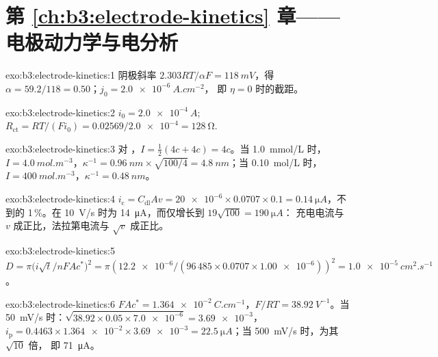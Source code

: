 \section*{第 \ref{ch:b3:electrode-kinetics} 章——电极动力学与电分析}

\begin{solution}{exo:b3:electrode-kinetics:1}
阴极斜率 $2.303RT/\alpha F = \qty{118}{mV}$，得 $\alpha = 59.2/118 = 0.50$；$j_0 = \qty{2.0e-6}{A.cm^{-2}}$，
即 $\eta = 0$ 时的截距。
\end{solution}

\begin{solution}{exo:b3:electrode-kinetics:2}
$i_0 = \qty{2.0e-4}{A}$; $R_{\mathrm{ct}} = RT/(Fi_0) = 0.02569/\num{2.0e-4} = \qty{128}{\ohm}$.
\end{solution}

\begin{solution}{exo:b3:electrode-kinetics:3}
对 ，$I = \frac12(4c + 4c) = 4c$。当 \qty{1.0}{mmol/L} 时，$I = \qty{4.0}{mol.m^{-3}}$，$\kappa^{-1} =
\qty{0.96}{nm} \times \sqrt{100/4} = \qty{4.8}{nm}$；当 \qty{0.10}{mol/L} 时，$I = \qty{400}{mol.m^{-3}}$，$\kappa^{-1} = \qty{0.48}{nm}$。
\end{solution}

\begin{solution}{exo:b3:electrode-kinetics:4}
$i_{\mathrm c} = C_{\mathrm{dl}}Av = \num{20e-6} \times 0.0707 \times 0.1 = \qty{0.14}{\micro A}$，不到的 1\,\%。在
\qty{10}{V/s} 时为 \qty{14}{\micro A}，而仅增长到 $19\sqrt{100} = \qty{190}{\micro A}$：
充电电流与 $v$ 成正比，法拉第电流与 $\sqrt v$ 成正比。
\end{solution}

\begin{solution}{exo:b3:electrode-kinetics:5}
$D = \pi\bigl(i\sqrt t/nFAc^*\bigr)^2 = \pi(\num{12.2e-6}/(96\,485 \times 0.0707 \times \num{1.00e-6}))^2 =
\qty{1.0e-5}{cm^2.s^{-1}}$。
\end{solution}

\begin{solution}{exo:b3:electrode-kinetics:6}
$FAc^* = \qty{1.364e-2}{C.cm^{-1}}$，$F/RT = \qty{38.92}{V^{-1}}$。当 \qty{50}{mV/s} 时：$\sqrt{38.92 \times 0.05 \times \num{7.0e-6}} =
\num{3.69e-3}$，$i_{\mathrm p} = 0.4463 \times \num{1.364e-2} \times \num{3.69e-3} = \qty{22.5}{\micro A}$；当 \qty{500}{mV/s} 时，为其 $\sqrt{10}$ 倍，
即 \qty{71}{\micro A}。
\end{solution}

